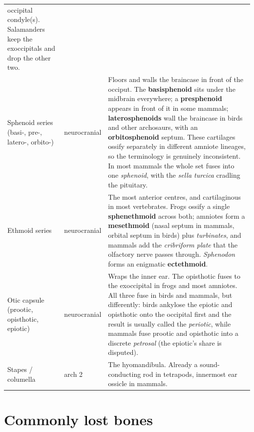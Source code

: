 \documentclass[11pt]{article}
\newcommand{\bone}[1]{\textbf{#1}}
\newcommand{\term}[1]{\textsl{#1}}
\begin{document}
\begin{xltabular}{\linewidth}{L{2.3cm} L{1.5cm} X}
  occipital condyle(s). Salamanders keep the exoccipitals and drop the other
  two. \\
Sphenoid series \newline (basi-, pre-, latero-, orbito-) & neurocranial &
  Floors and walls the braincase in front of the occiput. The
  \bone{basisphenoid} sits under the midbrain everywhere; a \bone{presphenoid}
  appears in front of it in some mammals; \bone{laterosphenoids} wall the
  braincase in birds and other archosaurs, with an \bone{orbitosphenoid}
  septum. These cartilages ossify separately in different amniote lineages, so
  the terminology is genuinely inconsistent. In most mammals the whole set
  fuses into one \term{sphenoid}, with the \term{sella turcica} cradling the
  pituitary. \\
Ethmoid series & neurocranial &
  The most anterior centres, and cartilaginous in most vertebrates. Frogs
  ossify a single \bone{sphenethmoid} across both; amniotes form a
  \bone{mesethmoid} (nasal septum in mammals, orbital septum in birds) plus
  \term{turbinates}, and mammals add the \term{cribriform plate} that the
  olfactory nerve passes through. \emph{Sphenodon} forms an enigmatic
  \bone{ectethmoid}. \\
Otic capsule \newline (prootic, opisthotic, epiotic) & neurocranial &
  Wraps the inner ear. The opisthotic fuses to the exoccipital in frogs and most
  amniotes. All three fuse in birds and mammals, but differently: birds
  ankylose the epiotic and opisthotic onto the occipital first and the result
  is usually called the \term{periotic}, while mammals fuse prootic and
  opisthotic into a discrete \term{petrosal} (the epiotic's share is
  disputed). \\
Stapes / columella & arch 2 &
  The hyomandibula. Already a sound-conducting rod in tetrapods, innermost ear
  ossicle in mammals. \\
\bottomrule
\end{xltabular}\endgroup


\section{Commonly lost bones}
\end{document}
